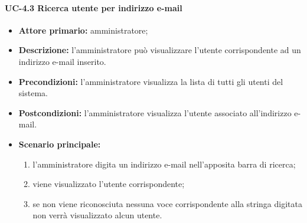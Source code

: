     \paragraph{UC-4.3 Ricerca utente per indirizzo e-mail}
    \begin{itemize}
        \item \textbf{Attore primario:} amministratore; 
    
        \item \textbf{Descrizione:} l'amministratore può visualizzare l'utente corrispondente ad un indirizzo e-mail inserito.
    
        \item \textbf{Precondizioni:} l'amministratore visualizza la lista di tutti gli utenti del sistema.
    
        \item \textbf{Postcondizioni:} l'amministratore visualizza l'utente associato all'indirizzo e-mail.
    
        \item \textbf{Scenario principale:}
              \begin{enumerate}
                  \item l'amministratore digita un indirizzo e-mail nell'apposita barra di ricerca;
                  \item viene visualizzato l'utente corrispondente;
                  \item se non viene riconosciuta nessuna voce corrispondente alla stringa digitata non verrà visualizzato alcun utente.
              \end{enumerate}
    \end{itemize}

